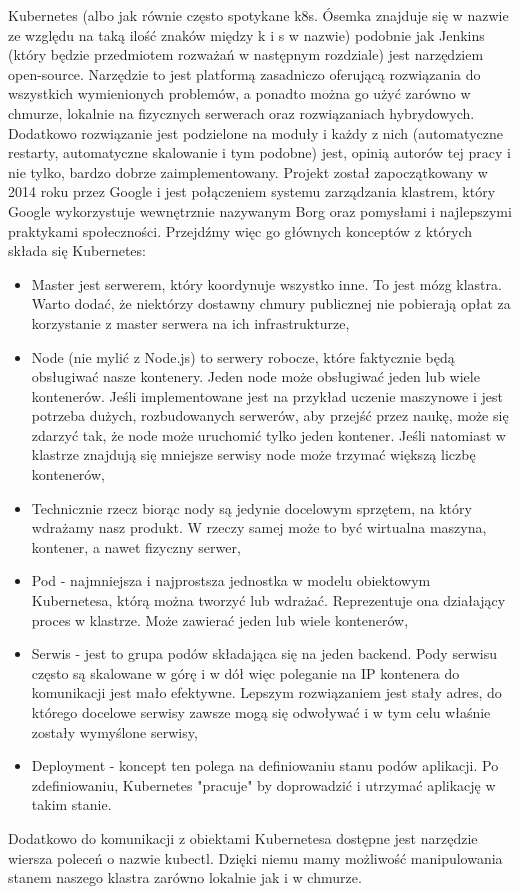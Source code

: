 Kubernetes (albo jak równie często spotykane k8s. Ósemka znajduje się w nazwie ze względu na taką ilość znaków między k i s w nazwie) podobnie jak Jenkins (który będzie przedmiotem rozważań w następnym rozdziale) jest narzędziem open-source. Narzędzie to jest platformą zasadniczo oferującą rozwiązania do wszystkich wymienionych problemów, a ponadto można go użyć zarówno w chmurze, lokalnie na fizycznych serwerach oraz rozwiązaniach hybrydowych. Dodatkowo rozwiązanie jest podzielone na moduły i każdy z nich (automatyczne restarty, automatyczne skalowanie i tym podobne) jest, opinią autorów tej pracy i nie tylko, bardzo dobrze zaimplementowany. 
Projekt został zapoczątkowany w 2014 roku przez Google i jest połączeniem systemu zarządzania klastrem, który Google wykorzystuje wewnętrznie nazywanym Borg oraz pomysłami i najlepszymi praktykami społeczności.
Przejdźmy więc go głównych konceptów z których składa się Kubernetes:
\begin{itemize}
    \item Master jest serwerem, który koordynuje wszystko inne. To jest mózg klastra. Warto dodać, że niektórzy dostawny chmury publicznej nie pobierają opłat za korzystanie z master serwera na ich infrastrukturze,
    \item Node (nie mylić z Node.js) to serwery robocze, które faktycznie będą obsługiwać nasze kontenery. Jeden node może obsługiwać jeden lub wiele kontenerów. Jeśli implementowane jest na przykład uczenie maszynowe i jest potrzeba dużych, rozbudowanych serwerów, aby przejść przez naukę, może się zdarzyć tak, że node może uruchomić tylko jeden kontener. Jeśli natomiast w klastrze znajdują się mniejsze serwisy node może trzymać większą liczbę kontenerów,
    \item Technicznie rzecz biorąc nody są jedynie docelowym sprzętem, na który wdrażamy nasz produkt. W rzeczy samej może to być wirtualna maszyna, kontener, a nawet fizyczny serwer,
    \item Pod - najmniejsza i najprostsza jednostka w modelu obiektowym Kubernetesa, którą można tworzyć lub wdrażać. Reprezentuje ona działający proces w klastrze. Może zawierać jeden lub wiele kontenerów,
    \item Serwis - jest to grupa podów składająca się na jeden backend. Pody serwisu często są skalowane w górę i w dół więc poleganie na IP kontenera do komunikacji jest mało efektywne. Lepszym rozwiązaniem jest stały adres, do którego docelowe serwisy zawsze mogą się odwoływać i w tym celu właśnie zostały wymyślone serwisy,
    \item Deployment - koncept ten polega na definiowaniu stanu podów aplikacji. Po zdefiniowaniu, Kubernetes "pracuje" by doprowadzić i utrzymać aplikację w takim stanie.
\end{itemize}

Dodatkowo do komunikacji z obiektami Kubernetesa dostępne jest narzędzie wiersza poleceń o nazwie kubectl. Dzięki niemu mamy możliwość manipulowania stanem naszego klastra zarówno lokalnie jak i w chmurze.


